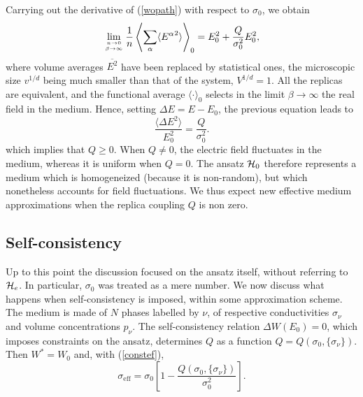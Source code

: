 Carrying out the derivative of (\ref{wopath})
with respect to $\sigma_0$, we obtain
\begin{equation}
\lim_{n\to 0\atop \beta\to\infty}\frac{1}{n}\left\langle\sum_\alpha
\langle{E^\alpha}^2\rangle\right\rangle_0=E_0^2+ \frac{Q}{\sigma_0^2}
E_0^2,
\end{equation}
where volume averages $\overline{E^2}$ have been replaced by statistical
ones, the microscopic size $v^{1/d}$ being much smaller than
that of the system, $V^{1/d}=1$.
All the replicas are equivalent, and the functional average $\langle\cdot\rangle_0$ selects in the limit $\beta\to\infty$ the real
field in the medium. Hence, setting $\Delta E=E-E_0$, the previous
equation leads to
\begin{equation}
\label{qq}
\frac{\langle\Delta E^2\rangle}{E_0^2}=\frac{Q}{\sigma_0^2}.
\end{equation}
which implies that $Q\geq 0$. When $Q\not=0$, the electric field
fluctuates in the medium, whereas it is uniform when $Q=0$. The ansatz
${\cal{H}}_0$ therefore represents a medium which is homogeneized
(because it is non-random), but which nonetheless
accounts for field fluctuations.
We thus expect new effective medium approximations
when the replica coupling $Q$ is non zero.

\subsection{Self-consistency}
\label{sc}
Up to this point the discussion focused on the ansatz itself, without
referring to ${\cal{H}}_e$. In particular, $\sigma_0$ was treated as a
mere number. We now discuss what happens when self-consistency is
imposed, within some approximation scheme. The medium is made of $N$
phases labelled by $\nu$, of respective conductivities $\sigma_\nu$
and volume concentrations $p_\nu$. The self-consistency relation
$\Delta W(E_0)=0$, which imposes constraints on the ansatz,
determines $Q$ as a function $Q=Q(\sigma_0,\{\sigma_\nu\})$.
Then $W^*=W_0$ and, with (\ref{constef}),
\begin{equation}
\label{sigeff}
\sigma_{\text{eff}}=\sigma_0\left[1-\frac{Q(\sigma_0,\{\sigma_\nu\})} {\sigma_0^2}\right].
\end{equation}

